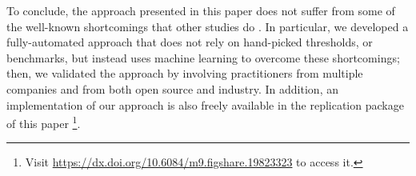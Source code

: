 
To conclude, the approach presented in this paper does not suffer from some of the well-known shortcomings that other studies do \cite{Khomyakov2020}.
In particular, we developed a fully-automated approach that does not rely on hand-picked thresholds, or benchmarks, but instead uses machine learning to overcome these shortcomings; then, we validated the approach by involving practitioners from multiple companies and from both open source and industry.
In addition, an implementation of our approach is also freely available in the replication package of this paper \footnote{Visit \url{https://dx.doi.org/10.6084/m9.figshare.19823323} to access it.}.


